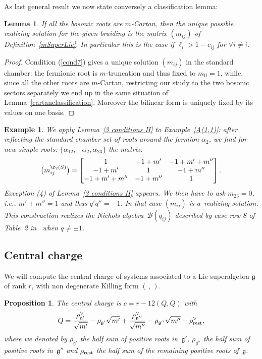 \documentclass[pdftex]{sigma}%
\numberwithin{equation}{section}
\newtheorem{lem}[teo]{Lemma}
\newtheorem{prop}[teo]{Proposition}
\newtheorem{ese}[teo]{Example}
\newcommand{\f}{\mathsf{f}}
\begin{document}
As last general result we now state conversely a classification lemma:
\begin{lem}\label{superlieclassification}
If all the bosonic roots are $m$-Cartan, then the unique possible realizing solution for the given braiding is the matrix $(m_{ij})$ of Definition~{\rm \ref{mSuperLie}}. In particular this is the case if $\ell_i > 1- c_{ij}$ for $\forall i \neq \f$.
\end{lem}

\begin{proof}
Condition (\ref{cond7}) gives a unique solution $(m_{ij})$ in the standard chamber: the fermionic root is $m$-truncation and thus fixed to $m_{\f\f} =1$, while, since all the other roots are $m$-Cartan, restricting our study to the two bosonic sectors separately we end up in the same situation of Lemma~\ref{cartanclassification}.
Moreover the bilinear form is uniquely fixed by its values on one basis.
\end{proof}

\begin{ese}\label{exm_superDReflection}
We apply Lemma~\ref{3 conditions II} to Example~\ref{A(1,1)}: after reflecting the standard chamber set of roots around the fermion $\alpha_2$, we find for new simple roots: $\lbrace \alpha_{12}, -\alpha_2, \alpha_{23}\rbrace$ the matrix:
\[ \big(m_{ij}^{\r_2(S)}\big)= \begin{bmatrix}
1 & -1 + m' & -1+m' +m'' \\
-1 + m' & 1 & -1 + m'' \\
-1+m' +m'' & -1+m'' & 1	
\end{bmatrix}.
\]
Exception (4) of Lemma~\ref{3 conditions II} appears. We then have to ask $m_{23}=0$, i.e., $m' + m''=1$ and thus $q'q''=-1$. In that case $(m_{ij})$ is a~realizing solution.
This construction realizes the Nichols algebra~$\mathcal{B}(q_{ij})$ described by case row 8 of Table~2 in~\cite{Hecklist} when $q\neq \pm 1$.
\end{ese}

\subsection{Central charge}
We will compute the central charge of systems associated to a Lie superalgebra $\mathfrak{g}$ of rank $r$, with non degenerate Killing form $(\,,\,)$.
\begin{prop}
The central charge is $c= r - 12(Q,Q)$ with \[Q=\frac{\rho_{\mathfrak{g'}}^\vee}{\sqrt{m'}}-\rho_{\mathfrak{g'}}\sqrt{m'}+\frac{\rho_{\mathfrak{g''}}^\vee}{\sqrt{m''}} -\rho_{\mathfrak{g''}}\sqrt{m''}-\rho_{{\rm rest}}^\vee,\]
where we denoted by $\rho_{\mathfrak{g'}}$ the half sum of positive roots in~$\mathfrak{g'}$, $\rho_{\mathfrak{g''}}$ the half sum of positive roots in~$\mathfrak{g''}$ and $\rho_{{\rm rest}}$ the half sum of the remaining positive roots of~$\mathfrak{g}$.
\end{prop}
\end{document}

